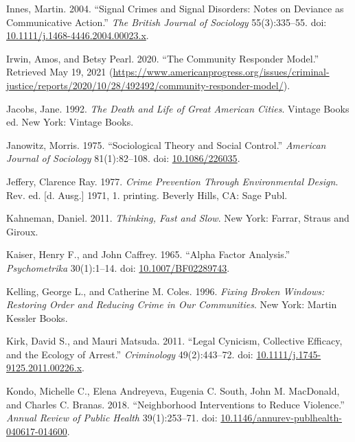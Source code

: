 \documentclass [11pt, proquest] {uwthesis}[2015/03/03]
\newlength{\cslhangindent}
\newenvironment{CSLReferences}[2]%
{\setlength{\parindent}{0pt}%
\everypar{\setlength{\hangindent}{\cslhangindent}}\ignorespaces}%
{\par}
\begin{document}
\begin{CSLReferences}{1}{0}
\leavevmode\hypertarget{ref-innesSignalCrimesSignal2004}{}%
Innes, Martin. 2004. {``Signal {Crimes} and {Signal Disorders}: {Notes} on {Deviance} as {Communicative Action}.''} \emph{The British Journal of Sociology} 55(3):335--55. doi: \href{https://doi.org/10.1111/j.1468-4446.2004.00023.x}{10.1111/j.1468-4446.2004.00023.x}.

\leavevmode\hypertarget{ref-irwinCommunityResponderModel2020}{}%
Irwin, Amos, and Betsy Pearl. 2020. {``The {Community Responder Model}.''} Retrieved May 19, 2021 (\url{https://www.americanprogress.org/issues/criminal-justice/reports/2020/10/28/492492/community-responder-model/}).

\leavevmode\hypertarget{ref-jacobsDeathLifeGreat1992}{}%
Jacobs, Jane. 1992. \emph{The Death and Life of Great {American} Cities}. Vintage Books ed. {New York}: {Vintage Books}.

\leavevmode\hypertarget{ref-janowitzSociologicalTheorySocial1975}{}%
Janowitz, Morris. 1975. {``Sociological {Theory} and {Social Control}.''} \emph{American Journal of Sociology} 81(1):82--108. doi: \href{https://doi.org/10.1086/226035}{10.1086/226035}.

\leavevmode\hypertarget{ref-jefferyCrimePreventionEnvironmental1977}{}%
Jeffery, Clarence Ray. 1977. \emph{Crime {Prevention} Through {Environmental Design}}. Rev. ed. {[}d. Ausg.{]} 1971, 1. printing. {Beverly Hills, CA}: {Sage Publ}.

\leavevmode\hypertarget{ref-kahnemanThinkingFastSlow2011}{}%
Kahneman, Daniel. 2011. \emph{Thinking, {Fast} and {Slow}}. {New York}: {Farrar, Straus and Giroux}.

\leavevmode\hypertarget{ref-kaiserAlphaFactorAnalysis1965}{}%
Kaiser, Henry F., and John Caffrey. 1965. {``Alpha Factor Analysis.''} \emph{Psychometrika} 30(1):1--14. doi: \href{https://doi.org/10.1007/BF02289743}{10.1007/BF02289743}.

\leavevmode\hypertarget{ref-kellingFixingBrokenWindows1996}{}%
Kelling, George L., and Catherine M. Coles. 1996. \emph{Fixing {Broken Windows}: {Restoring Order} and {Reducing Crime} in Our {Communities}}. {New York}: {Martin Kessler Books}.

\leavevmode\hypertarget{ref-kirkLegalCynicismCollective2011}{}%
Kirk, David S., and Mauri Matsuda. 2011. {``Legal {Cynicism}, {Collective Efficacy}, and the {Ecology} of {Arrest}.''} \emph{Criminology} 49(2):443--72. doi: \href{https://doi.org/10.1111/j.1745-9125.2011.00226.x}{10.1111/j.1745-9125.2011.00226.x}.

\leavevmode\hypertarget{ref-kondoNeighborhoodInterventionsReduce2018}{}%
Kondo, Michelle C., Elena Andreyeva, Eugenia C. South, John M. MacDonald, and Charles C. Branas. 2018. {``Neighborhood {Interventions} to {Reduce Violence}.''} \emph{Annual Review of Public Health} 39(1):253--71. doi: \href{https://doi.org/10.1146/annurev-publhealth-040617-014600}{10.1146/annurev-publhealth-040617-014600}.


\end{CSLReferences}
\end{document}
